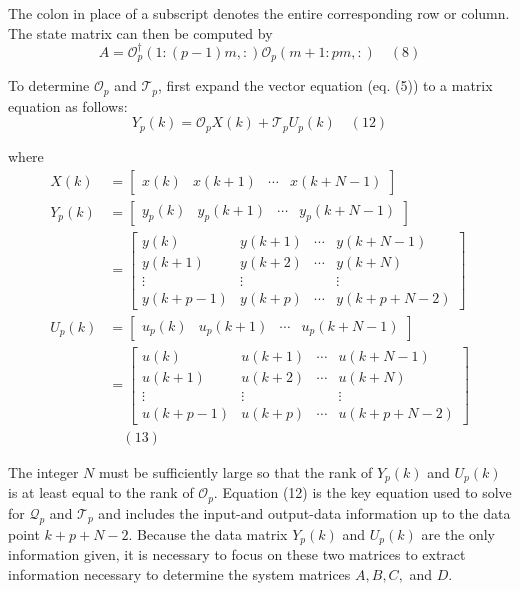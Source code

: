 The colon in place of a subscript denotes the entire corresponding row or column. 
The state matrix can then be computed by 
\[
    A = \mathcal{O}_p^\dagger(1:(p-1)m,:)\mathcal{O}_p(m+1:pm,:)\quad(8)
\]

To determine $\mathcal{O}_p$ and $\mathcal{T}_p$, first expand the vector equation (eq. (5)) to a matrix equation as follows: 
\[
    Y_p(k)=\mathcal{O}_pX(k)+\mathcal{T}_pU_p(k)\quad(12)
\]

where
\begin{align*}
    X(k)&=\begin{bmatrix}
        x(k)&x(k+1)&\cdots&x(k+N-1)
    \end{bmatrix}\\
    Y_p(k)&=\begin{bmatrix}
        y_p(k)&y_p(k+1)&\cdots &y_p(k+N-1)
    \end{bmatrix}\\
    &=\begin{bmatrix}
        y(k)&y(k+1)&\cdots &y(k+N-1)\\
        y(k+1)&y(k+2)&\cdots &y(k+N)\\
        \vdots&\vdots&&\vdots\\
        y(k+p-1)&y(k+p)&\cdots &y(k+p+N-2)
    \end{bmatrix}\\
    U_p(k)&=\begin{bmatrix}
        u_p(k)&u_p(k+1)&\cdots&u_p(k+N-1)
    \end{bmatrix}\\
    &=\begin{bmatrix}
        u(k)&u(k+1)&\cdots &u(k+N-1)\\
        u(k+1)&u(k+2)&\cdots &u(k+N)\\
        \vdots&\vdots&&\vdots\\
        u(k+p-1)&u(k+p)&\cdots&u(k+p+N-2)
    \end{bmatrix}\\
    &\quad (13)
\end{align*}

The integer $N$ must be sufficiently large so that the rank of $Y_p(k)$ and $U_p(k)$ is at least equal to the rank of $\mathcal{O}_p$. 
Equation (12) is the key equation used to solve for $\mathcal{Q}_p$ and $\mathcal{T}_p$ and includes the input-and output-data information up to the data point $k+p+N-2$. 
Because the data matrix $Y_p(k)$ and $U_p(k)$ are the only information given, it is necessary to focus on these two matrices to extract information necessary to determine the system matrices $A,B,C,$ and $D$. 


